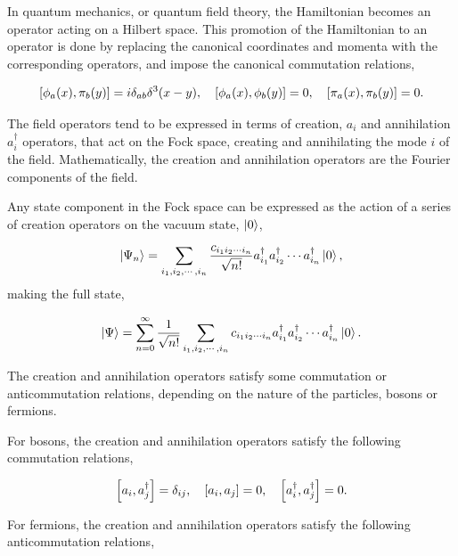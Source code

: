 \documentclass[11pt,a4paper,twoside,pdf]{article}
\numberwithin{equation}{section}
\begin{document}
In quantum mechanics, or quantum field theory, the Hamiltonian becomes an operator 
acting on a Hilbert space. This promotion of the Hamiltonian to an operator is done by
replacing the canonical coordinates and momenta with the corresponding operators, 
and impose the canonical commutation relations,

\begin{equation}
    \left[ \phi_a (x), \pi_b (y) \right] = i \delta_{ab} \delta^3(x-y),
    \quad \left[ \phi_a (x), \phi_b (y) \right] = 0, \quad
    \left[ \pi_a (x), \pi_b (y) \right] = 0.
\end{equation}

The field operators tend to be expressed in terms of creation, $a_i$ and annihilation 
$a^\dagger_i$ operators, that act on the Fock space, creating and annihilating the mode 
$i$ of the field. Mathematically, the creation and annihilation operators are the 
Fourier components of the field.

Any state component in the Fock space can be expressed as the action of a series of 
creation operators on the vacuum state, $\ket{0}$,

\begin{equation}
    \ket{\Psi_n} = \sum_{i_1,i_2,\cdots,i_n} \frac{c_{i_1 i_2 \cdots i_n}}{\sqrt{n!}}
    a^\dagger_{i_1} a^\dagger_{i_2} \cdots a^\dagger_{i_n} \ket{0},
\end{equation}
making the full state, 

\begin{equation}
    \ket{\Psi} = \sum_{n=0}^{\infty} \frac{1}{\sqrt{n!}} \sum_{i_1,i_2,\cdots,i_n} 
    c_{i_1 i_2 \cdots i_n} a^\dagger_{i_1} a^\dagger_{i_2} \cdots a^\dagger_{i_n} \ket{0}.
\end{equation}

The creation and annihilation operators satisfy some commutation or anticommutation 
relations, depending on the nature of the particles, bosons or fermions. 

For bosons, the creation and annihilation operators satisfy the following commutation 
relations,

\begin{equation}
    \left[ a_i, a_j^\dagger \right] = \delta_{ij}, \quad
    \left[ a_i, a_j \right] = 0, \quad
    \left[ a_i^\dagger, a_j^\dagger \right] = 0.
\end{equation}

For fermions, the creation and annihilation operators satisfy the following anticommutation
relations,
\end{document}
